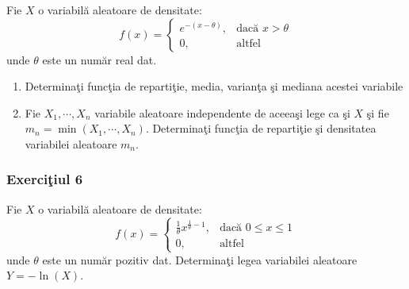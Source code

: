 \documentclass[]{article}
\def\t{{\theta}}
\begin{document}
Fie \(X\) o variabil\u a aleatoare de densitate: \[
  f(x) = \left\{\begin{array}{ll}
    e^{-(x-\t)}, & \mbox{dac\u a $x>\t$}\\
    0, & \mbox{altfel}
  \end{array}\right.
\] unde \(\t\) este un num\u ar real dat.

\begin{enumerate}
\def\labelenumi{\alph{enumi})}
\item
  Determina\c ti func\c tia de reparti\c tie, media, varian\c ta \c si
  mediana acestei variabile
\item
  Fie \(X_1,\cdots,X_n\) variabile aleatoare independente de aceea\c si
  lege ca \c si \(X\) \c si fie \(m_n=\min(X_1,\cdots,X_n)\).
  Determina\c ti func\c tia de reparti\c tie \c si densitatea variabilei
  aleatoare \(m_n\).
\end{enumerate}

\subsubsection{\texorpdfstring{Exerci\c tiul
6}{Exerciiul 6}}\label{exerciiul-6}

Fie \(X\) o variabil\u a aleatoare de densitate: \[
  f(x) = \left\{\begin{array}{ll}
    \frac{1}{\t}x^{\frac{1}{\t}-1}, & \mbox{dac\u a $0\leq x\leq 1$}\\
    0, & \mbox{altfel}
  \end{array}\right.
\] unde \(\t\) este un num\u ar pozitiv dat. Determina\c ti legea
variabilei aleatoare \(Y=-\ln(X)\).
\end{document}
